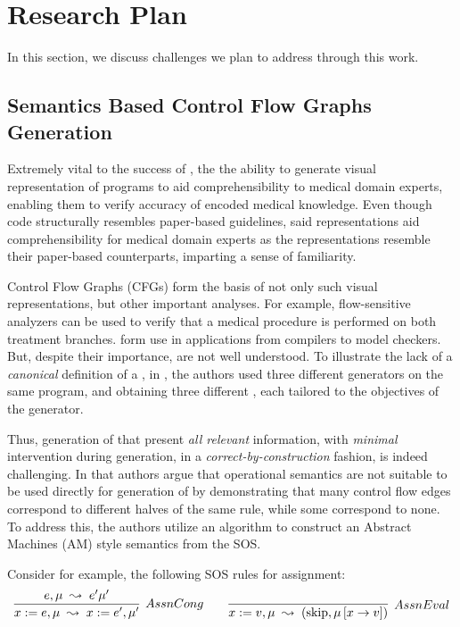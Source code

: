 \section{Research Plan}

In this section, we discuss challenges we plan to address through this work.

\subsection{Semantics Based Control Flow Graphs Generation}\label{subsec:visual-representation-generation}

Extremely vital to the success of \MediK{}, the the ability
to generate visual representation of \MediK{} programs to aid
comprehensibility to medical domain experts, enabling them to verify
accuracy of encoded medical knowledge. Even though \MediK{} code
structurally resembles paper-based guidelines, said
representations aid comprehensibility for medical
domain experts as the representations resemble their paper-based counterparts,
imparting a sense of familiarity.

Control Flow Graphs (CFGs) form the basis of not only such visual
representations, but other important analyses. For example,
flow-sensitive analyzers can be used to verify that a medical procedure
is performed on both treatment branches.
\CGSs{} form use in applications from compilers to model checkers.
But, despite their importance, \CGSs{} are not well understood.
To illustrate the lack of a \emph{canonical} definition of a \CGS{},
in \cite{KoppelICFP22}, the authors
used three different \CFG{} generators
on the same program, and obtaining three different \CFGs{}, each
tailored to the objectives of the generator.

Thus, generation of \CFGs{} that present \emph{all relevant} information,
with \emph{minimal} intervention during generation, in a
\emph{correct-by-construction} fashion, is indeed challenging.
In \cite{KoppelICFP22} that authors argue that operational semantics
are not suitable to be used directly for generation of \CFGs{} by demonstrating
that many control flow edges correspond to different halves of the same rule,
while some correspond to none. To address this, the authors utilize an algorithm
to construct an Abstract Machines (AM) style semantics from the SOS.

Consider for example, the following SOS rules for assignment:
$$
\infer[AssnCong]
{x := e, \mu\; \leadsto\; x := e^{\prime}, \mu^{\prime}}{e, \mu\; \leadsto\; e^{\prime}\mu^{\prime}}
\quad \quad
\infer[AssnEval]
{x := v,\mu\; \leadsto\; \left(\text{skip}, \mu\left[x \rightarrow v\right]\right)}{}
$$

